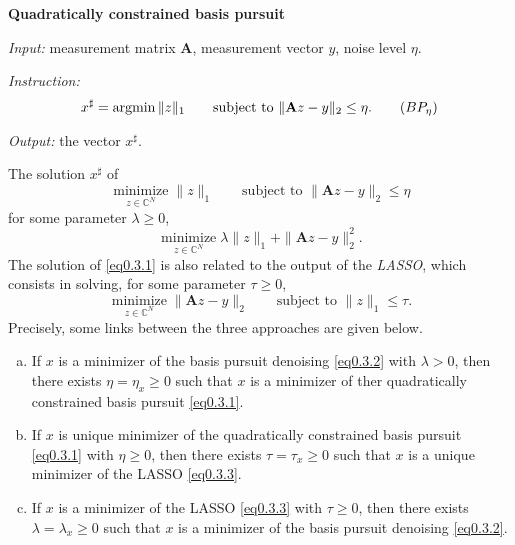 \begin{mdframed}
    \label{qbp}
    \begin{center}
        \textbf{\textcolor[rgb]{1,0,0}{Quadratically constrained basis pursuit}}
    \end{center}
    \emph{Input:} measurement matrix $\mathbf{A}$, measurement vector $y$, noise level $\eta$.

    \emph{Instruction:}
    \begin{equation}
        x^{\sharp} = \mathop{\mathrm{argmin}} \|z\|_1 \qquad \text{subject to } \|\mathbf{A}z - y\|_2 \leq \eta. \tag{$BP_{\eta}$}
        \label{eqbpn}
    \end{equation}

    \emph{Output:} the vector  $x^{\sharp}$.
\end{mdframed}
    The solution $x^{\sharp}$ of 
    \begin{equation}
        \mathop{\mathrm{minimize}}\limits_{z \in \mathbb{C}^{N}}\|z\|_1 \qquad \text{subject to }\|\mathbf{A}z - y\|_2 \leq \eta
        \label{eq0.3.1}
    \end{equation}
    for some parameter $\lambda \geq 0$,
    \begin{equation}
        \mathop{\mathrm{minimize}}\limits_{z \in \mathbb{C}^N} \lambda\|z\|_1 + \|\mathbf{A}z - y\|_2^2.
        \label{eq0.3.2}
    \end{equation}
    The solution of \cref{eq0.3.1} is also related to the output of the \emph{LASSO}, which consists in solving, for some parameter $\tau \geq 0$,
    \begin{equation}
        \mathop{\mathrm{minimize}}\limits_{z \in \mathbb{C}^N} \|\mathbf{A}z - y\|_2 \qquad \text{subject to }\|z\|_1 \leq \tau.
        \label{eq0.3.3}
    \end{equation}
    Precisely, some links between the three approaches are given below.


\begin{proposition}
    \label{pr0.3.2}
    \begin{enumerate}[(a)]
        \item If $x$ is a minimizer of the basis pursuit denoising \cref{eq0.3.2} with $\lambda > 0$, then there exists $\eta = \eta_x \geq 0$ such that $x$ is a minimizer of ther quadratically constrained basis pursuit \cref{eq0.3.1}.
        \item If $x$ is unique minimizer of the quadratically constrained basis pursuit \cref{eq0.3.1} with $\eta \geq 0$, then there exists $\tau = \tau_x \geq 0$ such that $x$ is a unique minimizer of the LASSO \cref{eq0.3.3}.
        \item If $x$ is a minimizer of the LASSO \cref{eq0.3.3} with $\tau \geq 0$, then there exists $\lambda = \lambda_x \geq 0$ such that $x$ is a minimizer of the basis pursuit denoising \cref{eq0.3.2}.
    \end{enumerate}
\end{proposition}

